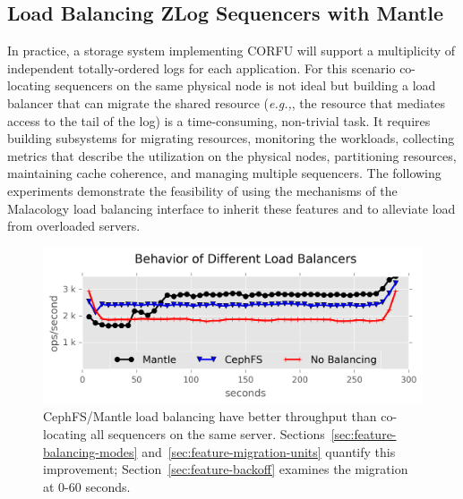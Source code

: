 \documentclass[preprint]{sigplanconf-eurosys}
\begin{document}
\subsection{Load Balancing ZLog Sequencers with Mantle}
\label{sec:zlog-balancing}

In practice, a storage system implementing CORFU will support a multiplicity of
independent totally-ordered logs for each application.  For this scenario
co-locating sequencers on the same physical node is not ideal but building a load
balancer that can migrate the shared resource ({\it e.g.,}, the resource that
mediates access to the tail of the log) is a time-consuming, non-trivial task.
It requires building subsystems for migrating resources, monitoring the
workloads, collecting metrics that describe the utilization on the physical
nodes, partitioning resources, maintaining cache coherence, and managing
multiple sequencers. The following experiments demonstrate the feasibility of
using the mechanisms of the Malacology load balancing interface to inherit
these features and to alleviate load from overloaded servers.

\begin{figure}[t!]
\centering
\includegraphics{figures/mantle-balancer-behaviors.png}
\caption{CephFS/Mantle load balancing have better throughput than co-locating
all sequencers on the same server.  Sections~\ref{sec:feature-balancing-modes}
and~\ref{sec:feature-migration-units} quantify this improvement;
Section~\ref{sec:feature-backoff} examines the migration at 0-60 seconds.
}\label{fig:mantle-balancer-behaviors}
\end{figure}
\end{document}
